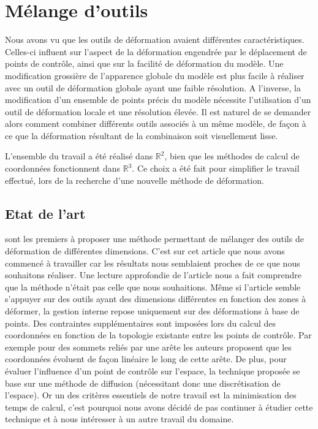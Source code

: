 

\chapter{Mélange d'outils}

\graphicspath{ {Chapter3/Chapter3Figs/PNG/}
  {Chapter3/Chapter3Figs/PDF/} {Chapter3/Chapter3Figs/} }

Nous avons vu que les outils de déformation avaient différentes
caractéristiques. Celles-ci influent sur l'aspect de la déformation engendrée
par le déplacement de points de contrôle, ainsi que sur la facilité de
déformation du modèle. Une modification grossière de l'apparence globale du
modèle est plus facile à réaliser avec un outil de déformation globale ayant
une faible résolution. A l'inverse, la modification d'un ensemble de points
précis du modèle nécessite l'utilisation d'un outil de déformation locale et
une résolution élevée. Il est naturel de se demander alors comment combiner
différents outils associés à un même modèle, de façon à ce que la déformation
résultant de la combinaison soit visuellement lisse.

L'ensemble du travail a été réalisé dans $\mathbb{R}^2$, bien que les méthodes
de calcul de coordonnées fonctionnent dans $\mathbb{R}^3$. Ce choix a été fait
pour simplifier le travail effectué, lors de la recherche d'une nouvelle
méthode de déformation.

\section{Etat de l'art}

\cite{JBPS11} sont les premiers à proposer une méthode permettant de mélanger
des outils de déformation de différentes dimensions. C'est sur cet article que
nous avons commencé à travailler car les résultats nous semblaient proches de
ce que nous souhaitons réaliser. Une lecture approfondie de l'article nous a
fait comprendre que la méthode n'était pas celle que nous souhaitions. Même si
l'article semble s'appuyer sur des outils ayant des dimensions différentes en
fonction des zones à déformer, la gestion interne repose uniquement sur des
déformations à base de points. Des contraintes supplémentaires sont imposées
lors du calcul des coordonnées en fonction de la topologie existante entre les
points de contrôle. Par exemple pour des sommets reliés par une arête les
auteurs proposent que les coordonnées évoluent de façon linéaire le long de
cette arête. De plus, pour évaluer l'influence d'un point de contrôle sur
l'espace, la technique proposée se base sur une méthode de diffusion
(nécessitant donc une discrétisation de l'espace). Or un des critères
essentiels de notre travail est la minimisation des temps de calcul, c'est
pourquoi nous avons décidé de pas continuer à étudier cette technique et à
nous intéresser à un autre travail du domaine.

